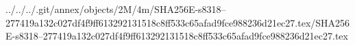 ../../../.git/annex/objects/2M/4m/SHA256E-s8318--277419a132c027df4f9ff613292131518c8ff533c65afad9fce988236d21ec27.tex/SHA256E-s8318--277419a132c027df4f9ff613292131518c8ff533c65afad9fce988236d21ec27.tex
